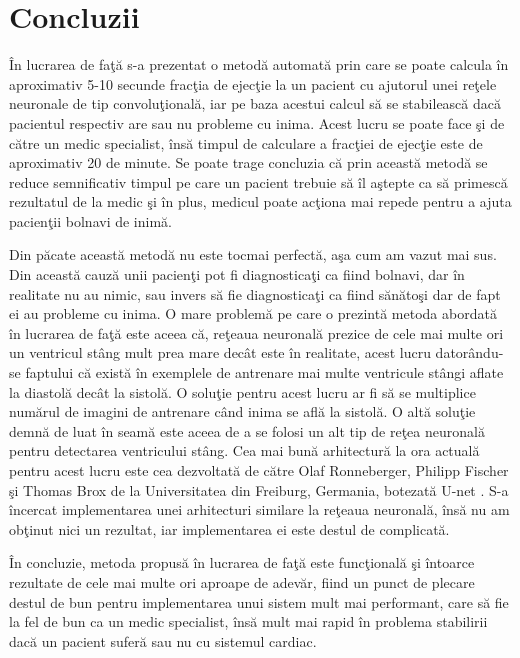 \chapter{Concluzii}

\^{I}n lucrarea de fa\c{t}\u{a} s-a prezentat o metod\u{a} automat\u{a} prin care se poate calcula \^{i}n aproximativ 5-10 secunde frac\c{t}ia de ejec\c{t}ie la un pacient cu ajutorul unei re\c{t}ele neuronale de tip convolu\c{t}ional\u{a}, iar pe baza acestui calcul s\u{a} se stabileasc\u{a} dac\u{a} pacientul respectiv are sau nu probleme cu inima. Acest lucru se poate face \c{s}i de c\u{a}tre un medic specialist, \^{i}ns\u{a} timpul de calculare a frac\c{t}iei de ejec\c{t}ie este de aproximativ 20 de minute. Se poate trage concluzia c\u{a} prin aceast\u{a} metod\u{a} se reduce semnificativ timpul pe care un pacient trebuie s\u{a} \^{i}l a\c{s}tepte ca s\u{a} primesc\u{a} rezultatul de la medic \c{s}i \^{i}n plus, medicul poate ac\c{t}iona mai repede pentru a ajuta pacien\c{t}ii bolnavi de inim\u{a}.

\par

Din p\u{a}cate aceast\u{a} metod\u{a} nu este tocmai perfect\u{a}, a\c{s}a cum am vazut mai sus. Din aceast\u{a} cauz\u{a} unii pacien\c{t}i pot fi diagnostica\c{t}i ca fiind bolnavi, dar \^{i}n realitate nu au nimic, sau invers s\u{a} fie diagnostica\c{t}i ca fiind s\u{a}n\u{a}to\c{s}i dar de fapt ei au probleme cu inima. O mare problem\u{a} pe care o prezint\u{a} metoda abordat\u{a} \^{i}n lucrarea de fa\c{t}\u{a} este aceea c\u{a}, re\c{t}eaua neuronal\u{a} prezice de cele mai multe ori un ventricul st\^{a}ng mult prea mare dec\^{a}t este \^{i}n realitate, acest lucru dator\^{a}ndu-se faptului c\u{a} exist\u{a} \^{i}n exemplele de antrenare mai multe ventricule st\^{a}ngi aflate la diastol\u{a} dec\^{a}t la sistol\u{a}. O solu\c{t}ie pentru acest lucru ar fi s\u{a} se multiplice num\u{a}rul de imagini de antrenare c\^{a}nd inima se afl\u{a} la sistol\u{a}. O alt\u{a} solu\c{t}ie demn\u{a} de luat \^{i}n seam\u{a} este aceea de a se folosi un alt tip de re\c{t}ea neuronal\u{a} pentru detectarea ventricului st\^{a}ng. Cea mai bun\u{a} arhitectur\u{a} la ora actual\u{a} pentru acest lucru este cea dezvoltat\u{a} de c\u{a}tre Olaf Ronneberger, Philipp Fischer \c{s}i Thomas Brox de la Universitatea din Freiburg, Germania, botezat\u{a} U-net \cite{Unet}. S-a \^{i}ncercat implementarea unei arhitecturi similare la re\c{t}eaua neuronal\u{a}, \^{i}ns\u{a} nu am ob\c{t}inut nici un rezultat, iar implementarea ei este destul de complicat\u{a}.

\par

\^{I}n concluzie, metoda propus\u{a} \^{i}n lucrarea de fa\c{t}\u{a} este func\c{t}ional\u{a} \c{s}i \^{i}ntoarce rezultate de cele mai multe ori aproape de adev\u{a}r, fiind un punct de plecare destul de bun pentru implementarea unui sistem mult mai performant, care s\u{a} fie la fel de bun ca un medic specialist, \^{i}ns\u{a} mult mai rapid \^{i}n problema stabilirii dac\u{a} un pacient sufer\u{a} sau nu cu sistemul cardiac. 